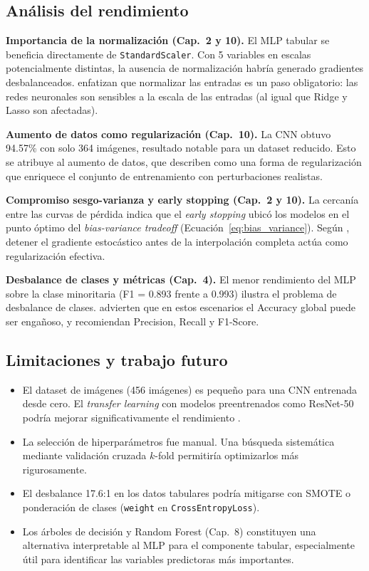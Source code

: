 \documentclass[12pt, a4paper]{article}
\begin{document}
\subsection{Análisis del rendimiento}

\textbf{Importancia de la normalización (Cap.~2 y 10).}
El MLP tabular se beneficia directamente de \texttt{StandardScaler}.
Con 5 variables en escalas potencialmente distintas, la ausencia de
normalización habría generado gradientes desbalanceados.
\citet[Sec.~10.9.1]{islp2023} enfatizan que normalizar las entradas
es un paso obligatorio: las redes neuronales son sensibles a la escala
de las entradas (al igual que Ridge y Lasso son afectadas).

\textbf{Aumento de datos como regularización (Cap.~10).}
La CNN obtuvo 94.57\% con solo 364 imágenes, resultado notable para un
dataset reducido. Esto se atribuye al aumento de datos, que
\citet[Sec.~10.3.4]{islp2023} describen como una forma de
regularización que enriquece el conjunto de entrenamiento con
perturbaciones realistas.

\textbf{Compromiso sesgo-varianza y early stopping (Cap.~2 y 10).}
La cercanía entre las curvas de pérdida indica que el \textit{early
stopping} ubicó los modelos en el punto óptimo del
\textit{bias-variance tradeoff} (Ecuación~\eqref{eq:bias_variance}).
Según \citet[Sec.~10.8]{islp2023}, detener el gradiente estocástico
antes de la interpolación completa actúa como regularización efectiva.

\textbf{Desbalance de clases y métricas (Cap.~4).}
El menor rendimiento del MLP sobre la clase minoritaria (F1 = 0.893
frente a 0.993) ilustra el problema de desbalance de clases.
\citet[Cap.~4]{islp2023} advierten que en estos escenarios el Accuracy
global puede ser engañoso, y recomiendan Precision, Recall y F1-Score.

\subsection{Limitaciones y trabajo futuro}

\begin{itemize}
  \item El dataset de imágenes (456 imágenes) es pequeño para una CNN
    entrenada desde cero. El \textit{transfer learning} con modelos
    preentrenados como ResNet-50 podría mejorar significativamente el
    rendimiento \citep[Sec.~10.9.4]{islp2023}.
  \item La selección de hiperparámetros fue manual. Una búsqueda
    sistemática mediante validación cruzada $k$-fold
    \citep[Cap.~5]{islp2023} permitiría optimizarlos más
    rigurosamente.
  \item El desbalance 17.6:1 en los datos tabulares podría mitigarse
    con SMOTE o ponderación de clases (\texttt{weight} en
    \texttt{CrossEntropyLoss}).
  \item Los árboles de decisión y Random Forest (Cap.~8) constituyen
    una alternativa interpretable al MLP para el componente tabular,
    especialmente útil para identificar las variables predictoras
    más importantes.
\end{itemize}
\end{document}
